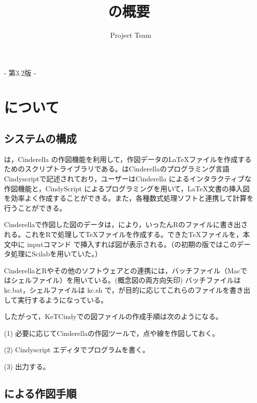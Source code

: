 \documentclass[papersize,a4paper,12pt,uplatex]{jsarticle}
\begin{document}
\title{\ketcindy の概要}
\author{\ketcindy\ Project Team}
\maketitle

\begin{center}  - 第3.2版 -\end{center}
\hypertarget{index}{}
\tableofcontents

\newpage

\section{\ketcindy について}
\subsection{システムの構成}
\ketcindy は，Cinderella の作図機能を利用して，作図データの\LaTeX ファイルを作成するためのスクリプトライブラリである。\ketcindy はCinderellaのプログラミング言語Cindyscriptで記述されており，ユーザーはCinderella によるインタラクティブな作図機能と，CindyScript によるプログラミングを用いて，\LaTeX 文書の挿入図を効率よく作成することができる。また，各種数式処理ソフトと連携して計算を行うことができる。

\begin{center}
\scalebox{0.9}{ }
\end{center}

Cinderellaで作図した図のデータは，\ketcindy により，いったんRのファイルに書き出される。これをRで処理して\TeX ファイルを作成する。できた\TeX ファイルを，本文中に inputコマンド で挿入すれば図が表示される。（\ketcindy の初期の版ではこのデータ処理にScilabを用いていた。）

CinderellaとRやその他のソフトウェアとの連携には，バッチファイル（Macではシェルファイル）を用いている。(概念図の両方向矢印)  バッチファイルは kc.bat，シェルファイルは kc.sh で，\ketcindy  が目的に応じてこれらのファイルを書き出して実行するようになっている。

したがって，KeTCindyでの図ファイルの作成手順は次のようになる。

(1) 必要に応じてCinderellaの作図ツールで，点や線を作図しておく。

(2) Cindyscript エディタでプログラムを書く。

(3) 出力する。

\newpage
\subsection{\ketcindy による作図手順}
\end{document}
